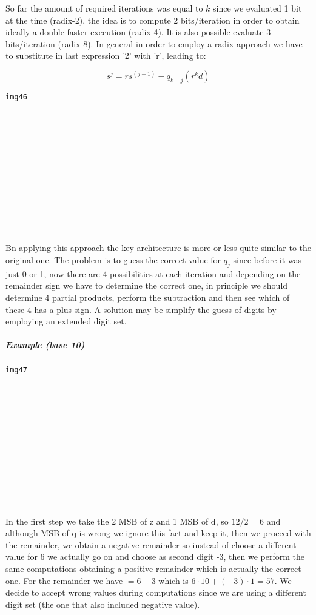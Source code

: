 So far the amount of required iterations was equal to $k$ since we evaluated 1 bit at the time (radix-2), the idea is to compute 2 bits/iteration in order to obtain ideally a double faster execution (radix-4). It is also possible evaluate 3 bits/iteration (radix-8). In general in order to employ a radix approach we have to substitute in last expression '2' with 'r', leading to:

$$s^{j}=rs^{(j-1)}-q_{k-j} (r^k d)$$

\begin{verbatim}
img46














\end{verbatim}

Bn applying this approach the key architecture is more or less quite similar to the original one. The problem is to guess the correct value for $q_j$ since before it was just 0 or 1, now there are 4 possibilities at each iteration and depending on the remainder sign we have to determine the correct one, in principle we should determine 4 partial products, perform the subtraction and then see which of these 4 has a plus sign. A solution may be simplify the guess of digits by employing an extended digit set.

\subparagraph{Example (base 10)}

\begin{verbatim}
img47














\end{verbatim}
In the first step we take the 2 MSB of z and 1 MSB of d, so $12/2=6$ and although MSB of q is wrong we ignore this fact and keep it, then we proceed with the remainder, we obtain a negative remainder so instead of choose a different value for 6 we actually go on and choose as second digit -3, then we perform the same computations obtaining a positive remainder which is actually the correct one. For the remainder we have $= 6 -3$ which is $6 \cdot 10+(-3) \cdot 1=57$. We decide to accept wrong values during computations since we are using a different digit set (the one that also included negative value).


